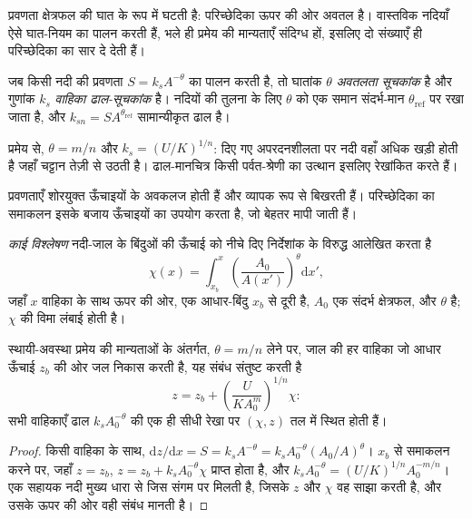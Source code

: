 प्रवणता क्षेत्रफल की घात के रूप में घटती है: परिच्छेदिका ऊपर की ओर अवतल है। वास्तविक
नदियाँ ऐसे घात-नियम का पालन करती हैं, भले ही प्रमेय की मान्यताएँ
संदिग्ध हों, इसलिए दो संख्याएँ ही परिच्छेदिका का सार दे देती हैं।

\begin{definition}[वाहिका ढाल-सूचकांक और अवतलता सूचकांक]\label{def:b3:quantitative-geomorphology:indices}
जब किसी नदी की प्रवणता $S = k_s A^{-\theta}$ का पालन करती है, तो घातांक
$\theta$ \emph{अवतलता सूचकांक} है और
गुणांक $k_s$ \emph{वाहिका ढाल-सूचकांक} है।
नदियों की तुलना के लिए $\theta$ को एक समान संदर्भ-मान
$\theta_{\mathrm{ref}}$ पर रखा जाता है, और $k_{sn} = S A^{\theta_{\mathrm{ref}}}$
सामान्यीकृत ढाल है।
\end{definition}

प्रमेय से, $\theta = m/n$ और $k_s = (U/K)^{1/n}$: दिए गए
अपरदनशीलता पर नदी वहाँ अधिक खड़ी होती है जहाँ चट्टान तेज़ी से उठती है। ढाल-मानचित्र
किसी पर्वत-श्रेणी का उत्थान इसलिए रेखांकित करते हैं।


प्रवणताएँ शोरयुक्त ऊँचाइयों के अवकलज होती हैं और व्यापक रूप से बिखरती हैं। परिच्छेदिका का समाकलन
इसके बजाय ऊँचाइयों का उपयोग करता है, जो बेहतर मापी जाती हैं।

\begin{definition}[काई विश्लेषण]\label{def:b3:quantitative-geomorphology:chi}
\emph{काई विश्लेषण} नदी-जाल के बिंदुओं की ऊँचाई को
नीचे दिए निर्देशांक के विरुद्ध आलेखित करता है
\[
\chi(x) = \int_{x_b}^{x} \left(\frac{A_0}{A(x')}\right)^{\theta}
\mathrm{d}x' ,
\]
जहाँ $x$ वाहिका के साथ ऊपर की ओर, एक आधार-बिंदु
$x_b$ से दूरी है, $A_0$ एक संदर्भ क्षेत्रफल, और $\theta$  है; $\chi$ की
विमा लंबाई होती है।
\end{definition}

\begin{proposition}\label{prop:b3:quantitative-geomorphology:chi}
स्थायी-अवस्था प्रमेय की मान्यताओं के अंतर्गत, $\theta = m/n$ लेने पर,
जाल की हर वाहिका जो आधार ऊँचाई $z_b$ की ओर जल निकास करती है, यह संबंध संतुष्ट करती है
\[
z = z_b + \left(\frac{U}{K A_0^{m}}\right)^{1/n} \chi :
\]
सभी वाहिकाएँ ढाल $k_s A_0^{-\theta}$ की एक ही सीधी रेखा पर
$(\chi, z)$ तल में स्थित होती हैं।
\end{proposition}

\begin{proof}
किसी वाहिका के साथ, $\mathrm{d}z/\mathrm{d}x = S = k_s A^{-\theta} = k_s
A_0^{-\theta}(A_0/A)^{\theta}$। $x_b$ से समाकलन करने पर, जहाँ $z = z_b$,
$z = z_b + k_s A_0^{-\theta}\chi$ प्राप्त होता है, और $k_s A_0^{-\theta} =
(U/K)^{1/n} A_0^{-m/n}$। एक सहायक नदी मुख्य धारा से जिस संगम पर मिलती है,
जिसके $z$ और $\chi$ वह साझा करती है, और उसके ऊपर की ओर वही संबंध मानती है।
\end{proof}

